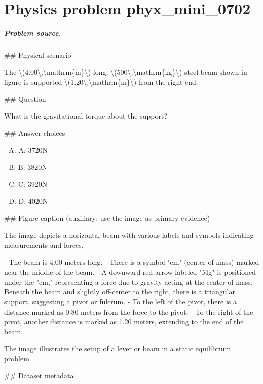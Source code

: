
\chapter{Physics problem phyx\_mini\_0702}
\label{ch:PhyXMiniProblems_problem_phyx_mini_0702}

\paragraph{Problem source.}
\#\# Physical scenario

The \textbackslash{}(4.00\textbackslash{},\textbackslash{}mathrm\{m\}\textbackslash{})-long, \textbackslash{}(500\textbackslash{},\textbackslash{}mathrm\{kg\}\textbackslash{}) steel beam shown in figure is supported \textbackslash{}(1.20\textbackslash{},\textbackslash{}mathrm\{m\}\textbackslash{}) from the right end.

\#\# Question

What is the gravitational torque about the support?

\#\# Answer choices

- A: A: 3720N

- B: B: 3820N

- C: C: 3920N

- D: D: 4020N

\#\# Figure caption (auxiliary; use the image as primary evidence)

The image depicts a horizontal beam with various labels and symbols indicating measurements and forces. 

- The beam is 4.00 meters long.
- There is a symbol "cm" (center of mass) marked near the middle of the beam.
- A downward red arrow labeled "Mg" is positioned under the "cm," representing a force due to gravity acting at the center of mass.
- Beneath the beam and slightly off-center to the right, there is a triangular support, suggesting a pivot or fulcrum.
- To the left of the pivot, there is a distance marked as 0.80 meters from the force to the pivot.
- To the right of the pivot, another distance is marked as 1.20 meters, extending to the end of the beam. 

The image illustrates the setup of a lever or beam in a static equilibrium problem.

\#\# Dataset metadata

